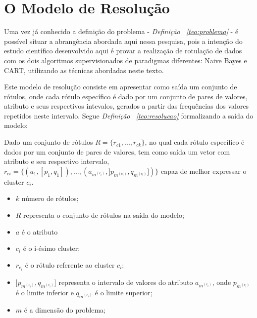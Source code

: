 \section{O Modelo de Resolução}\label{cap:ferramentas:sec:modeloresolucao}

Uma vez já conhecido a definição do problema - \textit{Definição ~\ref{teo:problema}} - é possível situar a abrangência abordada aqui nessa pesquisa, pois a intenção do estudo científico desenvolvido aqui é provar a realização de rotulação de dados com os dois algoritmos supervisionados de paradigmas diferentes: Naive Bayes e CART, utilizando as técnicas abordadas neste texto.

Este modelo de resolução consiste em apresentar como saída um conjunto de rótulos, onde cada rótulo específico é dado por um conjunto de pares de valores, atributo e seus respectivos intevalos, gerados a partir das frequências dos valores repetidos neste intervalo. Segue \textit{Definição ~\ref{teo:resolucao}} formalizando a saída do modelo:
    \begin{teorema}
    Dado um conjunto de rótulos ${ R=\{ r_{c1},...,r_{ck} \} }$, no qual cada rótulo específico é dados por um conjunto de pares de valores, tem como saída um vetor com atributo e seu respectivo intervalo, ${ r_{ci}=\{ (a_1,[p_1,q_1]),...,(a_{m^{(c_i)}}, ]p_{m^{(c_i)}},q_{m^{(c_i)}}]) \} }$ capaz de melhor expressar o cluster ${c_i}$.
        \footnotemark 
        \begin{itemize}[noitemsep]
            \item ${k}$ número de rótulos;
            \item ${R}$ representa o conjunto de rótulos na saída do modelo;
            \item ${a}$ é o atributo
            \item ${c_i}$ é o i-ésimo cluster;
            \item ${r_{c_i}}$ é o rótulo referente ao cluster ${c_i}$;
            \item ${]p_{m^{(c_i)}},q_{m^{(c_i)}}]}$ representa o intervalo de valores do atributo ${a_{m^{(c_i)}} }$, onde ${ p_{m^{(c_i)}} }$  é o limite inferior e ${ q_{m^{(c_i)}} }$ é o limite superior;
            \item ${m}$ é a dimensão do problema;
        \end{itemize}
    \label{teo:resolucao}
    \end{teorema}

